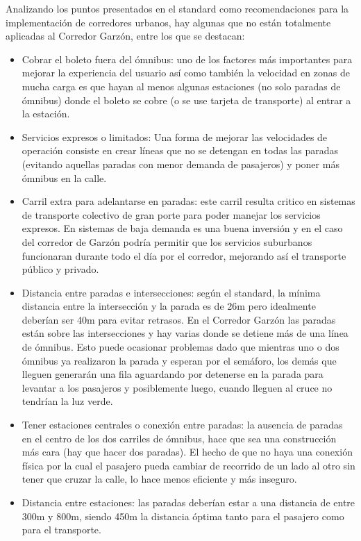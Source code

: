 Analizando los puntos presentados en el standard como recomendaciones para la implementación de corredores urbanos, hay algunas que no están totalmente aplicadas al Corredor Garzón, entre los que se destacan:

\begin{itemize}
	\item Cobrar el boleto fuera del ómnibus: uno de los factores más importantes para mejorar la experiencia del usuario así como también la velocidad en zonas de mucha carga es que hayan al menos algunas estaciones (no solo paradas de ómnibus) donde el boleto se cobre (o se use tarjeta de transporte) al entrar a la estación.
	\item Servicios expresos o limitados: Una forma de mejorar las velocidades de operación consiste en crear líneas que no se detengan en todas las paradas (evitando aquellas paradas con menor demanda de pasajeros) y poner más ómnibus en la calle.
	\item Carril extra para adelantarse en paradas: este carril resulta critico en sistemas de transporte colectivo de gran porte para poder manejar los servicios expresos. En sistemas de baja demanda es una buena inversión y en el caso del corredor de Garzón podría permitir que los servicios suburbanos funcionaran durante todo el día por el corredor, mejorando así el transporte público y privado.
	\item Distancia entre paradas e intersecciones: según el standard, la mínima distancia entre la intersección y la parada es de 26m pero idealmente deberían ser 40m para evitar retrasos. En el Corredor Garzón las paradas están sobre las intersecciones y hay varias donde se detiene más de una línea de ómnibus. Esto puede ocasionar problemas dado que mientras uno o dos ómnibus ya realizaron la parada y esperan por el semáforo, los demás que lleguen generarán una fila aguardando por detenerse en la parada para levantar a los pasajeros y posiblemente luego, cuando lleguen al cruce no tendrían la luz verde.
	\item Tener estaciones centrales o conexión entre paradas: la ausencia de paradas en el centro de los dos carriles de ómnibus, hace que sea una construcción más cara (hay que hacer dos paradas). El hecho de que no haya una conexión física por la cual el pasajero pueda cambiar de recorrido de un lado al otro sin tener que cruzar la calle, lo hace menos eficiente y más inseguro.
	\item Distancia entre estaciones:  las paradas deberían estar a una distancia de entre 300m y 800m, siendo 450m la distancia óptima tanto para el pasajero como para el transporte.

\end{itemize}

